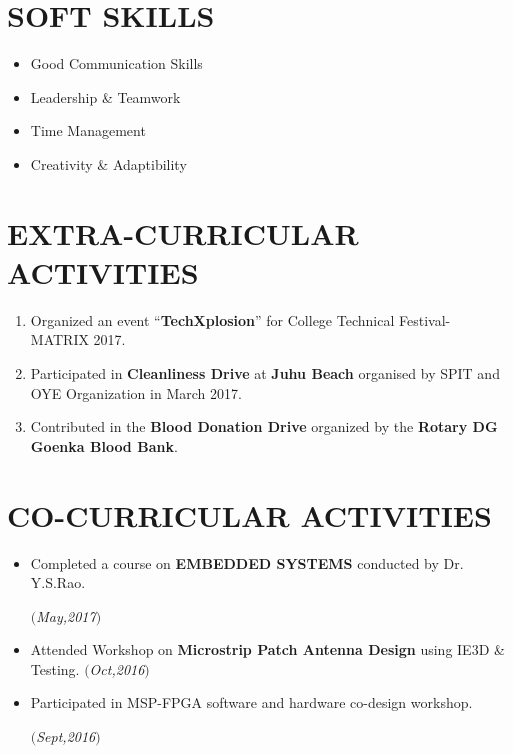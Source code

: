 \documentclass[margin]{res}
\begin{document}
\begin{resume}
\section{SOFT SKILLS}
\begin{itemize}

\item Good Communication Skills
\item Leadership \& Teamwork
\item Time Management
\item Creativity \& Adaptibility

\end{itemize}

\section{EXTRA-CURRICULAR ACTIVITIES}
\begin{enumerate}

\item Organized an event “\textbf{TechXplosion}” for College Technical Festival- MATRIX 2017.
\item  Participated in \textbf{Cleanliness Drive} at \textbf{Juhu Beach} organised by SPIT and OYE Organization in March 2017.
\item Contributed in the \textbf{Blood Donation Drive} organized by the \textbf{Rotary DG Goenka Blood Bank}.

\end{enumerate}

\section{CO-CURRICULAR ACTIVITIES}
\begin{itemize}
\item Completed a course on \textbf{EMBEDDED SYSTEMS} conducted by Dr. Y.S.Rao.  \hfill    \begin{flushright}\textit{$($May,2017$)$}
\end{flushright}
\item  Attended  Workshop on \textbf{Microstrip Patch Antenna Design} using IE3D \& Testing. \hfill \textit{$($Oct,2016$)$}

\item Participated in MSP-FPGA software and hardware co-design workshop.  \begin{flushright}   \textit{$($Sept,2016$)$}
\end{flushright}
\end{itemize}


\end{resume}
\end{document}

